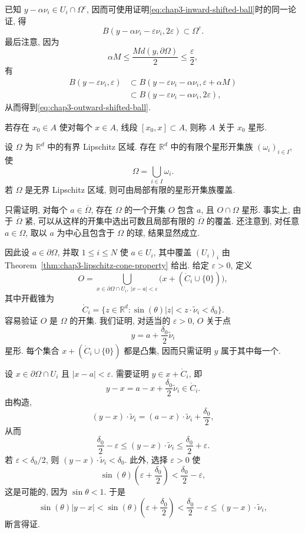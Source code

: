 \begin{Proof}
\begin{itemize}
 已知 $y-\alpha\nu_i\in U_i\cap\Omega^c$, 因而可使用证明\eqref{eq:chap3-inward-shifted-ball}时的同一论证, 得
 \[
  B(y-\alpha\nu_i-\varepsilon\nu_i,2\varepsilon)\subset\Omega^c.
 \]
 最后注意, 因为
 \[
  \alpha M\leq\frac{M d(y,\partial\Omega)}2\leq\frac\varepsilon2,
 \]
 有
 \[
 \begin{aligned}
  B(y-\varepsilon\nu_i,\varepsilon)
  &\subset B(y-\varepsilon\nu_i-\alpha\nu_i,\varepsilon+\alpha M)\\
  &\subset B(y-\varepsilon\nu_i-\alpha\nu_i,2\varepsilon),
 \end{aligned}
 \]
 从而得到\eqref{eq:chap3-outward-shifted-ball}.
\end{itemize}
\end{Proof}

\begin{Definition}
\label{def:chap3-star-shaped}
若存在 $x_0\in A$ 使对每个 $x\in A$, 线段 $[x_0,x]\subset A$, 则称 $A$ 关于 $x_0$ 星形.
\end{Definition}

\begin{Lemma}
\label{lem:chap3-lipschitz-locally-star-shaped}
设 $\Omega$ 为 $\mathbb R^d$ 中的有界 Lipschitz 区域. 存在 $\mathbb R^d$ 中的有限个星形开集族 $(\omega_i)_{i\in I}$, 使
\[
 \Omega=\bigcup_{i\in I}\omega_i.
\]
若 $\Omega$ 是无界 Lipschitz 区域, 则可由局部有限的星形开集族覆盖.
\end{Lemma}

\begin{Proof}
只需证明, 对每个 $a\in\overline\Omega$, 存在 $\Omega$ 的一个开集 $O$ 包含 $a$, 且 $O\cap\Omega$ 星形. 事实上, 由于 $\overline\Omega$ 紧, 可以从这样的开集中选出可数且局部有限的 $\overline\Omega$ 的覆盖. 还注意到, 对任意 $a\in\Omega$, 取以 $a$ 为中心且包含于 $\Omega$ 的球, 结果显然成立.

因此设 $a\in\partial\Omega$, 并取 $1\leq i\leq N$ 使 $a\in U_i$, 其中覆盖 $(U_i)_i$ 由 Theorem~\ref{thm:chap3-lipschitz-cone-property} 给出. 给定 $\varepsilon>0$, 定义
\[
 O=\bigcup_{x\in\partial\Omega\cap U_i,\ |x-a|<\varepsilon}
 \bigl(x+(\mathring C_i\cup\{0\})\bigr),
\]
其中开截锥为
\[
 \mathring C_i=
 \{z\in\mathbb R^d:\sin(\theta)|z|<z\cdot\widetilde\nu_i<\delta_0\}.
\]
容易验证 $O$ 是 $\Omega$ 的开集. 我们证明, 对适当的 $\varepsilon>0$, $O$ 关于点
\[
 y=a+\frac{\delta_0}{2}\widetilde\nu_i
\]
星形. 每个集合 $x+(\mathring C_i\cup\{0\})$ 都是凸集, 因而只需证明 $y$ 属于其中每一个.

设 $x\in\partial\Omega\cap U_i$ 且 $|x-a|<\varepsilon$. 需要证明 $y\in x+\mathring C_i$, 即
\[
 y-x=a-x+\frac{\delta_0}{2}\widetilde\nu_i\in\mathring C_i.
\]
由构造,
\[
 (y-x)\cdot\widetilde\nu_i=(a-x)\cdot\widetilde\nu_i+\frac{\delta_0}{2},
\]
从而
\[
 \frac{\delta_0}{2}-\varepsilon
 \leq(y-x)\cdot\widetilde\nu_i
 \leq\frac{\delta_0}{2}+\varepsilon.
\]
若 $\varepsilon<\delta_0/2$, 则 $(y-x)\cdot\widetilde\nu_i<\delta_0$. 此外, 选择 $\varepsilon>0$ 使
\[
 \sin(\theta)\left(\varepsilon+\frac{\delta_0}{2}\right)
 <\frac{\delta_0}{2}-\varepsilon,
\]
这是可能的, 因为 $\sin\theta<1$. 于是
\[
 \sin(\theta)|y-x|
 <\sin(\theta)\left(\varepsilon+\frac{\delta_0}{2}\right)
 <\frac{\delta_0}{2}-\varepsilon
 \leq(y-x)\cdot\widetilde\nu_i,
\]
断言得证.
\end{Proof}

